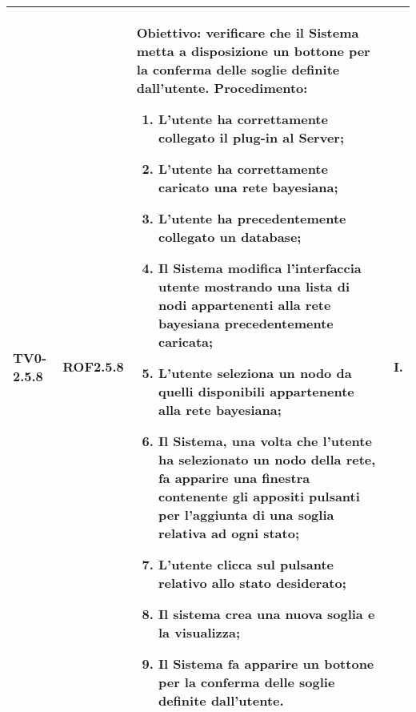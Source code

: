 \begin{longtable}{|C{.15\textwidth}|C{.13\textwidth}|m{.52\textwidth}|C{.08\textwidth}|}
TV0-2.5.8 & ROF2.5.8 &
	\textbf{Obiettivo}: verificare che il Sistema metta a disposizione un bottone per la conferma delle soglie definite dall'utente. \newline
	\textbf{Procedimento}:
	\begin{enumerate}
		\item L'utente ha correttamente collegato il plug-in al Server;
		\item L'utente ha correttamente caricato una rete bayesiana;
		\item L'utente ha precedentemente collegato un database;
		\item Il Sistema modifica l'interfaccia utente mostrando una lista di nodi appartenenti alla rete bayesiana precedentemente caricata;
		\item L'utente seleziona un nodo da quelli disponibili appartenente alla rete bayesiana;
		\item Il Sistema, una volta che l'utente ha selezionato un nodo della rete, fa apparire una finestra contenente gli appositi pulsanti per l'aggiunta di una soglia relativa ad ogni stato;
		\item L'utente clicca sul pulsante relativo allo stato desiderato;
		\item Il sistema crea una nuova soglia e la visualizza;
		\item Il Sistema fa apparire un bottone per la conferma delle soglie definite dall'utente.
	\end{enumerate}
	& I. \\
\hline


\end{longtable}
